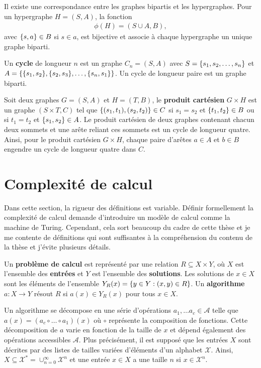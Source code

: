 Il existe une correspondance entre les graphes bipartis et les hypergraphes.
Pour un hypergraphe $H = (S, A)$,
la fonction 
\begin{align}
  \phi(H) = (S \cup A, B),
\end{align}
avec $\qty{s, a} \in B$ si $s \in a$,
est bijective et associe à chaque hypergraphe un unique graphe biparti.

Un \textbf{cycle} de longueur $n$ est un graphe $C_n = (S, A)$
avec $S = \qty{s_1, s_2, \ldots, s_n}$ et 
$A = \qty{\qty{s_1, s_2}, \qty{s_2, s_3}, \ldots, \qty{s_n, s_1}}$.
Un cycle de longueur paire est un graphe biparti.

Soit deux graphes $G = (S, A)$ et $H = (T, B)$,
le \textbf{produit cartésien} $G \times H$ est un graphe $(S \times T, C)$
tel que $\qty{(s_1, t_1), (s_2, t_2)} \in C$ si 
$s_1 = s_2$ et $\qty{t_1, t_2} \in B$ ou si $t_1 = t_2$ et $\qty{s_1, s_2} \in A$.
Le produit cartésien de deux graphes contenant chacun deux sommets et une arête reliant ces
sommets est un cycle de longueur quatre.
Ainsi,
pour le produit cartésien $G \times H$,
chaque paire d'arêtes $a \in A$ et $b \in B$ engendre un cycle de longueur quatre dans $C$.

\chapter{Complexité de calcul}
\label{chap:complexite_calcul}

Dans cette section,
la rigueur des définitions est variable.
Définir formellement la complexité de calcul demande d'introduire un modèle de 
calcul comme la machine de Turing.
Cependant,
cela sort beaucoup du cadre de cette thèse
et je me contente de définitions qui sont suffisantes à la compréhension du contenu de la thèse
et j'évite plusieurs détails.

Un \textbf{problème de calcul} est représenté par une relation $R \subseteq X \times Y$, 
où $X$ est l'ensemble des \textbf{entrées} et $Y$ est l'ensemble des \textbf{solutions}.
Les solutions de $x \in X$ sont les éléments de l'ensemble $Y_R(x) = \qty{y \in Y : (x, y)\in R}$.
Un \textbf{algorithme} $a: X \to Y$ résout $R$ si $a(x) \in Y_R(x)$ pour tous $x \in X$.

Un algorithme se décompose en une série d'opérations $a_1, \ldots a_c \in \mathcal A$ telle
que $a(x) = (a_c \circ \ldots \circ a_1)(x)$ où $\circ$ représente la composition
de fonctions.
Cette décomposition de $a$ varie en fonction de la taille de $x$
et dépend également des opérations accessibles $\mathcal A$.
Plus précisément,
il est supposé que les entrées $X$ sont décrites par des listes de tailles variées
d'éléments d'un alphabet $\mathcal X$.
Ainsi,
$X \subseteq \mathcal X^* = \cup_{n=0}^\infty \mathcal X^n$ et
une entrée $x \in X$ a une taille $n$ si $x \in \mathcal X^n$.


